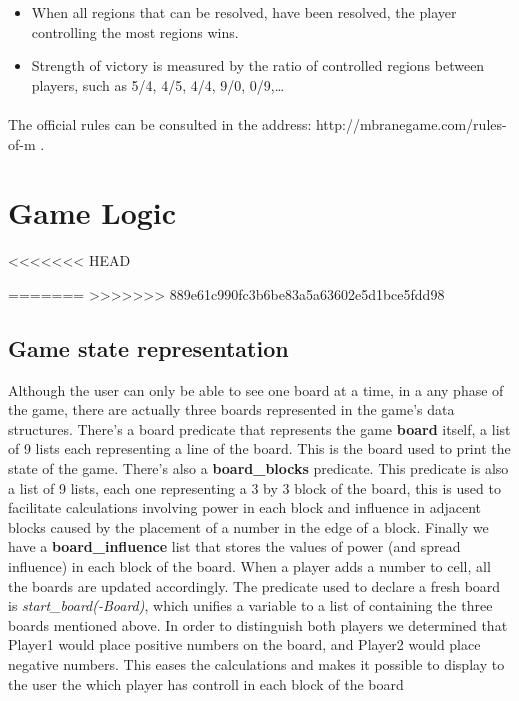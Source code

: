 \documentclass[a4paper]{article}
\begin{document}
\begin{itemize}
    \item When all regions that can be resolved, have been resolved, the player controlling the most regions wins.
    \item Strength of victory is measured by the ratio of controlled regions between players, such as 5/4, 4/5, 4/4, 9/0, 0/9,\ldots
\end{itemize}

\paragraph{}
The official rules can be consulted in the address: http://mbranegame.com/rules-of-m \cite{Rules}.

\pagebreak
\section{Game Logic}

<<<<<<< HEAD

=======
>>>>>>> 889e61c990fc3b6be83a5a63602e5d1bce5fdd98
\subsection{Game state representation} 
Although the user can only be able to see one board at a time, in a any phase of the game, there are actually three
boards represented in the game’s data structures. There’s a board predicate that represents the game \textbf{board} itself, a
list of 9 lists each representing a line of the board. This is the board used to print the state of the game. There’s 
also a \textbf{board\_blocks} predicate. This predicate is also a list of 9 lists, each one representing a 3 by 3 block of the 
board, this is used to facilitate calculations involving power in each block and influence in adjacent blocks caused 
by the placement of a number in the edge of a block. Finally we have a \textbf{board\_influence} list that stores the values of 
power (and spread influence) in each block of the board.  When a player adds a number to cell, all the boards are 
updated accordingly. The predicate used to declare a fresh board is \textit{start\_board(-Board)}, which unifies a variable to a list 
of containing the three boards mentioned above. In order to distinguish both players we determined that Player1 would place 
positive numbers on the board, and Player2 would place negative numbers. This eases the calculations and makes it possible 
to display to the user the which player has controll in each block of the board
\end{document}

